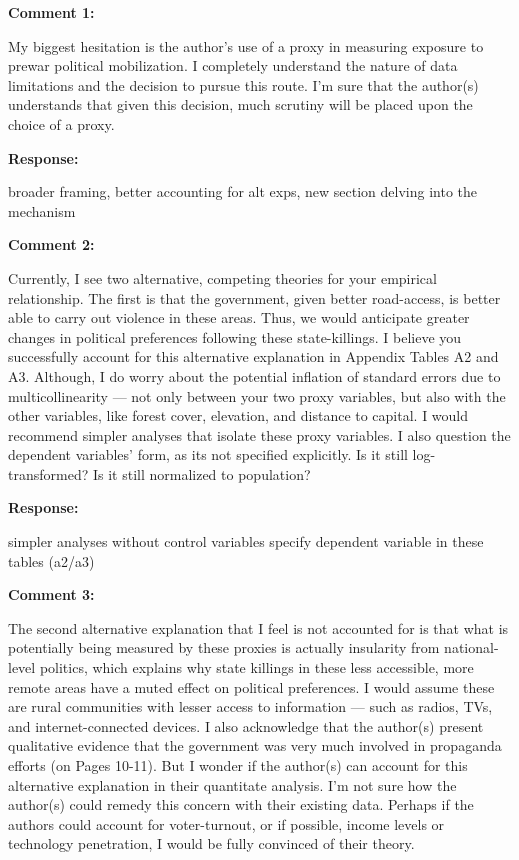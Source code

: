 \documentclass[12pt, a4paper, notitlepage]{article}
\begin{document}
\vspace{15pt}
\noindent\textbf{Comment 1:}
\begin{displayquote}
My biggest hesitation is the author’s use of a proxy in measuring exposure to prewar political mobilization. I completely understand the nature of data limitations and the decision to pursue this route. I’m sure that the author(s) understands that given this decision, much scrutiny will be placed upon the choice of a proxy.
\end{displayquote}

\noindent\textbf{Response:} {}

broader framing, better accounting for alt exps, new section delving into the mechanism

\vspace{15pt}
\noindent\textbf{Comment 2:}
\begin{displayquote}
Currently, I see two alternative, competing theories for your empirical relationship. The first is that the government, given better road-access, is better able to carry out violence in these areas. Thus, we would anticipate greater changes in political preferences following these state-killings. I believe you successfully account for this alternative explanation in Appendix Tables A2 and A3. Although, I do worry about the potential inflation of standard errors due to multicollinearity — not only between your two proxy variables, but also with the other variables, like forest cover, elevation, and distance to capital. I would recommend simpler analyses that isolate these proxy variables. I also question the dependent variables’ form, as its not specified explicitly. Is it still log- transformed? Is it still normalized to population?
\end{displayquote}

\noindent\textbf{Response:} {}

simpler analyses without control variables
specify dependent variable in these tables (a2/a3)

\vspace{15pt}
\noindent\textbf{Comment 3:}
\begin{displayquote}
The second alternative explanation that I feel is not accounted for is that what is potentially being measured by these proxies is actually insularity from national- level politics, which explains why state killings in these less accessible, more remote areas have a muted effect on political preferences. I would assume these are rural communities with lesser access to information — such as radios, TVs, and internet-connected devices. I also acknowledge that the author(s) present qualitative evidence that the government was very much involved in propaganda efforts (on Pages 10-11). But I wonder if the author(s) can account for this alternative explanation in their quantitate analysis. I’m not sure how the author(s) could remedy this concern with their existing data. Perhaps if the authors could account for voter-turnout, or if possible, income levels or technology penetration, I would be fully convinced of their theory.
\end{displayquote}
\end{document}
